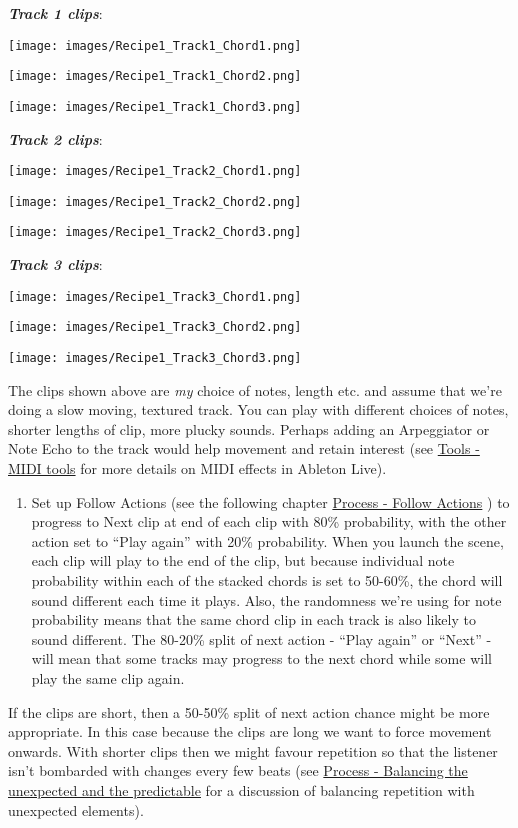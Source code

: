 \documentclass[
  12pt,
  letterpaper,
  oneside,
  open=any]{scrbook}
\providecommand{\tightlist}{%
  \setlength{\itemsep}{0pt}\setlength{\parskip}{0pt}}\usepackage{longtable,booktabs,array}
\begin{document}
\textbf{\emph{Track 1 clips}}:

\texttt{[image: images/Recipe1\_Track1\_Chord1.png]}

\texttt{[image: images/Recipe1\_Track1\_Chord2.png]}

\texttt{[image: images/Recipe1\_Track1\_Chord3.png]}

\textbf{\emph{Track 2 clips}}:

\texttt{[image: images/Recipe1\_Track2\_Chord1.png]}

\texttt{[image: images/Recipe1\_Track2\_Chord2.png]}

\texttt{[image: images/Recipe1\_Track2\_Chord3.png]}

\textbf{\emph{Track 3 clips}}:

\texttt{[image: images/Recipe1\_Track3\_Chord1.png]}

\texttt{[image: images/Recipe1\_Track3\_Chord2.png]}

\texttt{[image: images/Recipe1\_Track3\_Chord3.png]}

The clips shown above are \emph{my} choice of notes, length etc. and
assume that we're doing a slow moving, textured track. You can play with
different choices of notes, shorter lengths of clip, more plucky sounds.
Perhaps adding an Arpeggiator or Note Echo to the track would help
movement and retain interest (see
\hyperref[Chapter-004-Tools-MIDI_tools]{Tools - MIDI tools} for more
details on MIDI effects in Ableton Live).

\begin{enumerate}
\def\labelenumi{\arabic{enumi}.}
\setcounter{enumi}{6}
\tightlist
\item
  Set up Follow Actions (see the following chapter
  \hyperref[Chapter-003-Process-Follow_Actions]{Process - Follow
  Actions} ) to progress to Next clip at end of each clip with 80\%
  probability, with the other action set to ``Play again'' with 20\%
  probability. When you launch the scene, each clip will play to the end
  of the clip, but because individual note probability within each of
  the stacked chords is set to 50-60\%, the chord will sound different
  each time it plays. Also, the randomness we're using for note
  probability means that the same chord clip in each track is also
  likely to sound different. The 80-20\% split of next action - ``Play
  again'' or ``Next'' - will mean that some tracks may progress to the
  next chord while some will play the same clip again.
\end{enumerate}

If the clips are short, then a 50-50\% split of next action chance might
be more appropriate. In this case because the clips are long we want to
force movement onwards. With shorter clips then we might favour
repetition so that the listener isn't bombarded with changes every few
beats (see
\hyperref[Chapter-009-Process-Balance_unexpected_and_predictable]{Process
- Balancing the unexpected and the predictable} for a discussion of
balancing repetition with unexpected elements).
\end{document}
